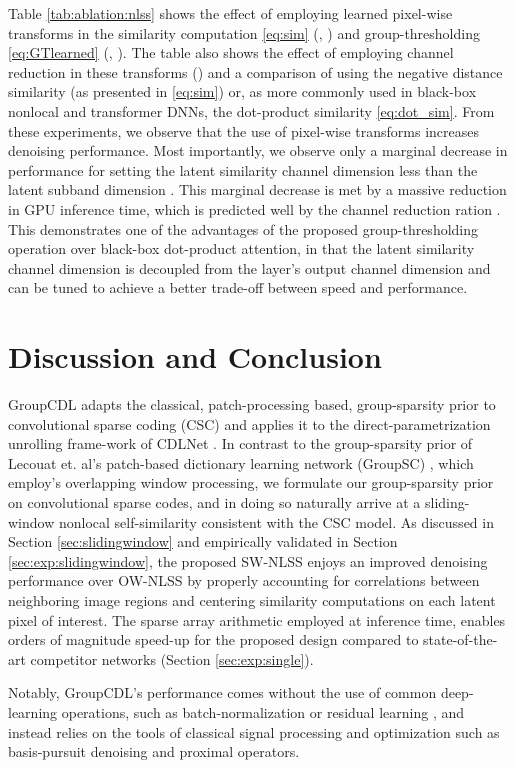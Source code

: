 \documentclass[lettersize,journal]{IEEEtran}
\newcommand{\soa}{state-of-the-art }
\begin{document}
Table \ref{tab:ablation:nlss} shows the effect of employing learned pixel-wise
transforms in the similarity computation \eqref{eq:sim} (, ) and
group-thresholding \eqref{eq:GTlearned} (, ). The table
also shows the effect of employing channel reduction in these transforms () and a comparison of using the negative distance similarity (as
presented in \eqref{eq:sim}) or, as more commonly used in black-box nonlocal and
transformer DNNs, the dot-product similarity \eqref{eq:dot_sim}. From these
experiments, we observe that the use of pixel-wise transforms increases
denoising performance. Most importantly, we observe only a marginal decrease in
performance for setting the latent similarity channel dimension less than the
latent subband dimension . This marginal decrease is met by a massive
reduction in GPU inference time, which is predicted well by the channel
reduction ration . This demonstrates one of
the advantages of the proposed group-thresholding operation over black-box
dot-product attention, in that the latent similarity channel dimension  is decoupled
from the layer's output channel dimension and can be tuned
to achieve a better trade-off between speed and performance.

\section{Discussion and Conclusion}
GroupCDL adapts the classical, patch-processing based, group-sparsity
prior to convolutional sparse coding (CSC) and applies it to the
direct-parametrization unrolling frame-work of CDLNet
\cite{janjusevicCDLNet2022}.
In contrast to the group-sparsity prior of Lecouat et. al's 
patch-based dictionary learning network (GroupSC) \cite{lecouat2020nonlocal},
which employ's overlapping window processing, we formulate our group-sparsity
prior on convolutional sparse codes, and in doing so naturally arrive at a
sliding-window nonlocal self-similarity consistent with the CSC model. 
As discussed in Section \ref{sec:slidingwindow} and empirically validated in Section
\ref{sec:exp:slidingwindow}, the proposed SW-NLSS enjoys an
improved denoising performance over OW-NLSS by properly accounting for
correlations between neighboring image regions and centering similarity computations on each latent pixel of interest. The sparse array arithmetic
employed at inference time, enables orders of magnitude speed-up for the
proposed design compared to \soa competitor networks (Section
\ref{sec:exp:single}). 

Notably, GroupCDL's performance comes without the use of common deep-learning
operations, such as batch-normalization \cite{Ioffe2015} or residual learning
\cite{DnCNN}, and instead relies on the tools of classical signal processing and
optimization such as basis-pursuit denoising and proximal operators.
\end{document}
